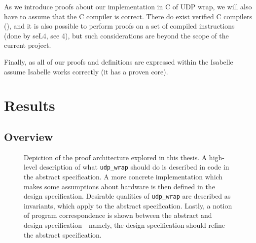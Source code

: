 \documentclass[twoside]{memoir}
\begin{document}
As we introduce proofs about our implementation in C of UDP wrap,
we will also have to assume that the C compiler is correct.
There do exist verified C compilers (\cite{compcert}),
and it is also possible to perform proofs on a set of compiled instructions
(done by seL4, see \cite{Klein2014Verification}{4}),
but such considerations are beyond the scope of the current project.

Finally, as all of our proofs and definitions are expressed within the Isabelle 
assume Isabelle works correctly (it has a proven core).

\chapter{Results}

\section{Overview}
\begin{figure}[h]
    \centering
    \caption{Depiction of the proof architecture explored in this thesis.
    A high-level description of what \lstinline{udp_wrap} should do
    is described in code in the abstract specification.
    A more concrete implementation which makes some assumptions about hardware
    is then defined in the design specification.
    Desirable qualities of \lstinline{udp_wrap} are described as invariants,
    which apply to the abstract specification.
    Lastly, a notion of program correspondence is shown between the
    abstract and design specification---namely, the design specification
    should refine the abstract specification.
    }
    \label{fig:proof-structure-abstract-design}
\end{figure}
\end{document}
